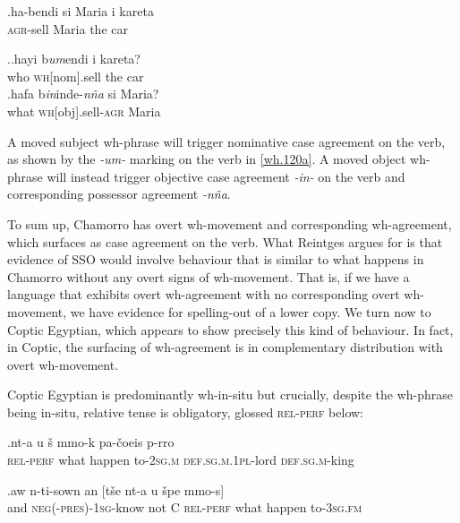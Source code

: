 \documentclass[charis]{glossa}
\begin{document}
\exg.\label{wh.110}ha-bendi si Maria i kareta\\
   \textsc{agr}-sell {} Maria the car\\

\ex.\ag.\label{wh.120a}hayi b\textit{um}endi i kareta?\\
   who \textsc{wh}[nom].sell the car\\
   \bg.\label{wh.120b}hafa b\textit{in}inde-\textit{n\~na} si Maria?\\
   what \textsc{wh}[obj].sell-\textsc{agr} {} Maria\\

A moved subject wh-phrase will trigger nominative case agreement on the verb, as shown by the \textit{-um-} marking on the verb in \ref{wh.120a}. A moved object wh-phrase will instead trigger objective case agreement \textit{-in-} on the verb and corresponding possessor agreement \textit{-n\~na}.

To sum up, Chamorro has overt wh-movement and corresponding wh-agreement, which surfaces as case agreement on the verb. What Reintges argues for is that evidence of SSO would involve behaviour that is similar to what happens in Chamorro without any overt signs of wh-movement. That is, if we have a language that exhibits overt wh-agreement with no corresponding overt wh-movement, we have evidence for spelling-out of a lower copy. We turn now to Coptic Egyptian, which appears to show precisely this kind of behaviour. In fact, in Coptic, the surfacing of wh-agreement is in complementary distribution with overt wh-movement.

Coptic Egyptian is predominantly wh-in-situ but crucially, despite the wh-phrase being in-situ, relative tense is obligatory, glossed \textsc{rel-perf} below:

\exg.\label{wh.130}{\textschwa}nt-a u \v{s}{\textopeno} {\textschwa}mmo-k pa-\v{c}oeis p-{\textschwa}rro\\
   \textsc{rel-perf} what happen to-\textsc{2sg.m} \textsc{def.sg.m.1pl}-lord \textsc{def.sg.m}-king\\

\exg.\label{wh.140}aw{\textopeno} n-ti-sown an [t\v{s}e nt-a u \v{s}{\textopeno}pe {\textschwa}mmo-s]\\
   and \textsc{neg(-pres)-1sg}-know not C \textsc{rel-perf} what happen to-\textsc{3sg.fm}\\
\end{document}
